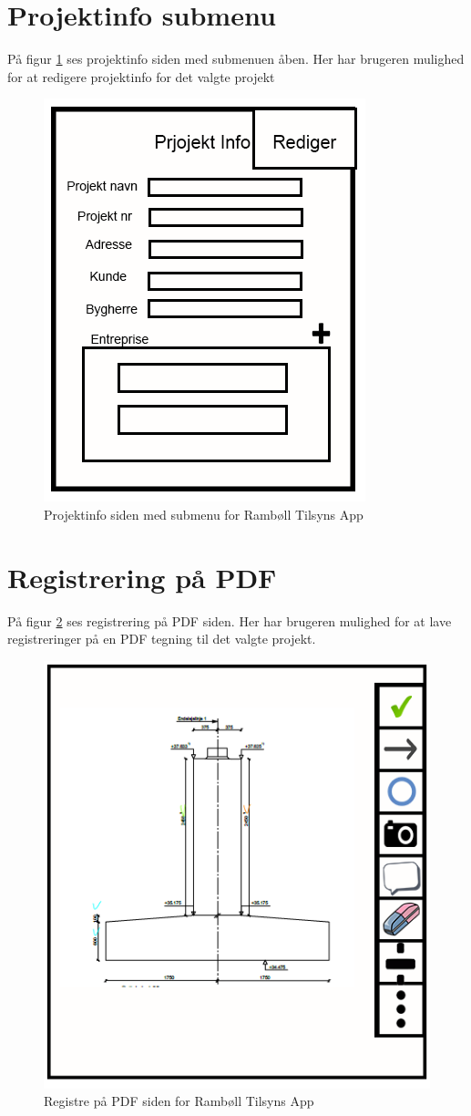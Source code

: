\section{Projektinfo submenu}\label{sec:ProjektinfoSubMock}
På figur \ref{fig:ProjektinfoSubMock} ses projektinfo siden med submenuen åben. Her har brugeren mulighed for at redigere projektinfo for det valgte projekt

\begin{figure}[H]
	\centering
	\includegraphics[width=0.4\linewidth]{MockUps/Mock/Ramboell-ProjektInfo-Sub}
	\caption{Projektinfo siden med submenu for Rambøll Tilsyns App}
	\label{fig:ProjektinfoSubMock}
\end{figure}

\clearpage

\section{Registrering på PDF}\label{sec:RegPaaPDFMock}
På figur \ref{fig:RegPaaPDFMock} ses registrering på PDF siden. Her har brugeren mulighed for at lave registreringer på en PDF tegning til det valgte projekt.

\begin{figure}[H]
	\centering
	\includegraphics[width=0.4\linewidth]{MockUps/Mock/Ramboell-PDF-Reg}
	\caption{Registre på PDF siden for Rambøll Tilsyns App}
	\label{fig:RegPaaPDFMock}
\end{figure}



